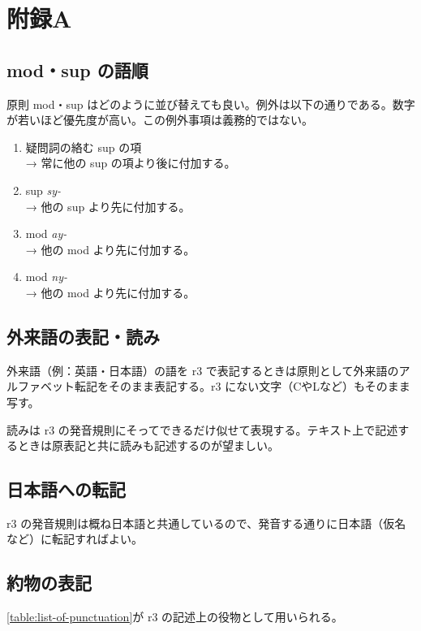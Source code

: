 \chapter{附録A}

\section{mod・sup の語順}

原則 mod・sup はどのように並び替えても良い。例外は以下の通りである。数字が若いほど優先度が高い。この例外事項は義務的ではない。

\begin{enumerate}
    \item 疑問詞の絡む sup の項 \\ → 常に他の sup の項より後に付加する。
    \item sup \emph{sy-} \\ → 他の sup より先に付加する。
    \item mod \emph{ay-} \\ → 他の mod より先に付加する。
    \item mod \emph{ny-} \\ → 他の mod より先に付加する。
\end{enumerate}

\section{外来語の表記・読み}

外来語（例：英語・日本語）の語を r3 で表記するときは原則として外来語のアルファベット転記をそのまま表記する。r3 にない文字（CやLなど）もそのまま写す。

読みは r3 の発音規則にそってできるだけ似せて表現する。テキスト上で記述するときは原表記と共に読みも記述するのが望ましい。

\section{日本語への転記}

r3 の発音規則は概ね日本語と共通しているので、発音する通りに日本語（仮名など）に転記すればよい。

\section{約物の表記}

\cref{table:list-of-punctuation}が r3 の記述上の役物として用いられる。

